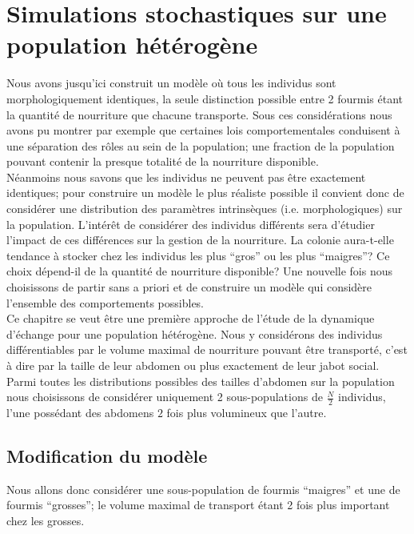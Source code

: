 
\chapter{Simulations stochastiques sur une population hétérogène}

Nous avons jusqu'ici construit un modèle où tous les individus sont morphologiquement identiques, la seule distinction possible entre 2 fourmis étant la quantité de nourriture que chacune transporte. Sous ces considérations nous avons pu montrer par exemple que certaines lois comportementales conduisent à une séparation des rôles au sein de la population; une fraction de la population pouvant contenir la presque totalité de la  nourriture disponible.\\

Néanmoins nous savons que les individus ne peuvent pas être exactement identiques; pour construire un modèle le plus réaliste possible il convient donc de considérer une distribution des paramètres intrinsèques (i.e. morphologiques) sur la population. L'intérêt de considérer des individus différents sera d'étudier l'impact de ces différences sur la gestion de la nourriture. La colonie aura-t-elle tendance à stocker chez les individus les plus ``gros'' ou les plus ``maigres''? Ce choix dépend-il de la quantité de nourriture disponible? Une nouvelle fois nous choisissons de partir sans a priori et de construire un modèle qui considère l'ensemble des comportements possibles.\\

Ce chapitre se veut être une première approche de l'étude de la dynamique d'échange pour une population hétérogène. Nous y considérons des individus différentiables par le volume maximal de nourriture pouvant être transporté, c'est à dire par la taille de leur abdomen ou plus exactement de leur jabot social. Parmi toutes les distributions possibles des tailles d'abdomen sur la population nous choisissons de considérer uniquement   2 sous-populations de $\frac{N}{2}$ individus, l'une possédant des abdomens $2$ fois plus volumineux que l'autre.

\section{Modification du modèle}

Nous allons donc considérer une sous-population de fourmis ``maigres'' et une de fourmis ``grosses''; le volume maximal de transport étant 2 fois plus important chez les grosses. \\

